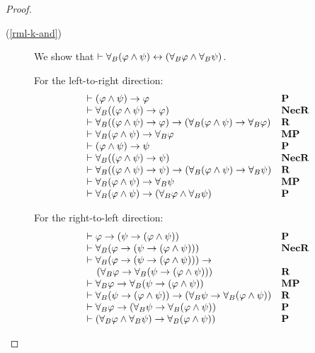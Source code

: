 \begin{proof}
\begin{description}
    \item[(\ref{rml-k-and})]
    We show that $\vdash {\forall_{B}} (\varphi \land \psi) \leftrightarrow ({\forall_{B}} \varphi \land {\forall_{B}} \psi)$.

    For the left-to-right direction:
    $$
    \begin{array}{ll}
        \vdash (\varphi \land \psi) \rightarrow \varphi & \text{{\bf P}}\\
        \vdash {\forall_{B}} ((\varphi \land \psi) \rightarrow \varphi) & \text{{\bf NecR}}\\
        \vdash {\forall_{B}} ((\varphi \land \psi) \rightarrow \varphi) \rightarrow ({\forall_{B}} (\varphi \land \psi) \rightarrow {\forall_{B}} \varphi) & \text{{\bf R}}\\
        \vdash {\forall_{B}} (\varphi \land \psi) \rightarrow {\forall_{B}} \varphi & \text{{\bf MP}}\\
        \vdash (\varphi \land \psi) \rightarrow \psi & \text{{\bf P}}\\
        \vdash {\forall_{B}} ((\varphi \land \psi) \rightarrow \psi) & \text{{\bf NecR}}\\
        \vdash {\forall_{B}} ((\varphi \land \psi) \rightarrow \psi) \rightarrow ({\forall_{B}} (\varphi \land \psi) \rightarrow {\forall_{B}} \psi) & \text{{\bf R}}\\
        \vdash {\forall_{B}} (\varphi \land \psi) \rightarrow {\forall_{B}} \psi & \text{{\bf MP}}\\
        \vdash {\forall_{B}} (\varphi \land \psi) \rightarrow ({\forall_{B}} \varphi \land {\forall_{B}} \psi) & \text{{\bf P}}
    \end{array}
    $$

    For the right-to-left direction:
    $$
    \begin{array}{ll}
        \vdash \varphi \rightarrow (\psi \rightarrow (\varphi \land \psi)) & \text{{\bf P}}\\
        \vdash {\forall_{B}} (\varphi \rightarrow (\psi \rightarrow (\varphi \land \psi))) & \text{{\bf NecR}}\\
        \vdash {\forall_{B}} (\varphi \rightarrow (\psi \rightarrow (\varphi \land \psi))) \rightarrow \\\quad({\forall_{B}} \varphi \rightarrow {\forall_{B}} (\psi \rightarrow (\varphi \land \psi))) & \text{{\bf R}}\\
        \vdash {\forall_{B}} \varphi \rightarrow {\forall_{B}} (\psi \rightarrow (\varphi \land \psi)) & \text{{\bf MP}}\\
        \vdash {\forall_{B}} (\psi \rightarrow (\varphi \land \psi)) \rightarrow ({\forall_{B}} \psi \rightarrow {\forall_{B}} (\varphi \land \psi)) & \text{{\bf R}}\\
        \vdash {\forall_{B}} \varphi \rightarrow ({\forall_{B}} \psi \rightarrow {\forall_{B}} (\varphi \land \psi)) & \text{{\bf P}}\\
        \vdash ({\forall_{B}} \varphi \land {\forall_{B}} \psi) \rightarrow {\forall_{B}} (\varphi \land \psi)) & \text{{\bf P}}
    \end{array}
    $$


\end{description}
\end{proof}
